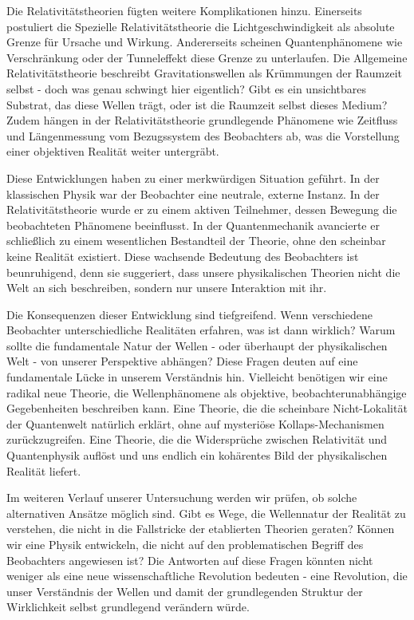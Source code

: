 Die Relativitätstheorien fügten weitere Komplikationen hinzu. Einerseits postuliert die Spezielle Relativitätstheorie die Lichtgeschwindigkeit als absolute Grenze für Ursache und Wirkung.
Andererseits scheinen Quantenphänomene wie Verschränkung oder der Tunneleffekt diese Grenze zu unterlaufen. Die Allgemeine Relativitätstheorie beschreibt Gravitationswellen als Krümmungen
der Raumzeit selbst - doch was genau schwingt hier eigentlich? Gibt es ein unsichtbares Substrat, das diese Wellen trägt, oder ist die Raumzeit selbst dieses Medium? Zudem hängen in der
Relativitätstheorie grundlegende Phänomene wie Zeitfluss und Längenmessung vom Bezugssystem des Beobachters ab, was die Vorstellung einer objektiven Realität weiter untergräbt.

Diese Entwicklungen haben zu einer merkwürdigen Situation geführt. In der klassischen Physik war der Beobachter eine neutrale, externe Instanz. In der Relativitätstheorie wurde er zu einem
aktiven Teilnehmer, dessen Bewegung die beobachteten Phänomene beeinflusst. In der Quantenmechanik avancierte er schließlich zu einem wesentlichen Bestandteil der Theorie, ohne den scheinbar
keine Realität existiert. Diese wachsende Bedeutung des Beobachters ist beunruhigend, denn sie suggeriert, dass unsere physikalischen Theorien nicht die Welt an sich beschreiben, sondern
nur unsere Interaktion mit ihr.

Die Konsequenzen dieser Entwicklung sind tiefgreifend. Wenn verschiedene Beobachter unterschiedliche Realitäten erfahren, was ist dann wirklich? Warum sollte die fundamentale Natur
der Wellen - oder überhaupt der physikalischen Welt - von unserer Perspektive abhängen? Diese Fragen deuten auf eine fundamentale Lücke in unserem Verständnis hin. Vielleicht benötigen
wir eine radikal neue Theorie, die Wellenphänomene als objektive, beobachterunabhängige Gegebenheiten beschreiben kann. Eine Theorie, die die scheinbare Nicht-Lokalität der Quantenwelt
natürlich erklärt, ohne auf mysteriöse Kollaps-Mechanismen zurückzugreifen. Eine Theorie, die die Widersprüche zwischen Relativität und Quantenphysik auflöst und uns endlich ein kohärentes
Bild der physikalischen Realität liefert.

Im weiteren Verlauf unserer Untersuchung werden wir prüfen, ob solche alternativen Ansätze möglich sind. Gibt es Wege, die Wellennatur der Realität zu verstehen, die nicht in die
Fallstricke der etablierten Theorien geraten? Können wir eine Physik entwickeln, die nicht auf den problematischen Begriff des Beobachters angewiesen ist? Die Antworten auf diese Fragen
könnten nicht weniger als eine neue wissenschaftliche Revolution bedeuten - eine Revolution, die unser Verständnis der Wellen und damit der grundlegenden Struktur der Wirklichkeit selbst
grundlegend verändern würde.
